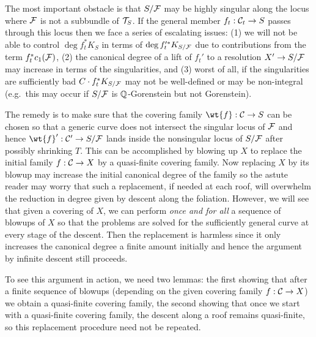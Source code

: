 \documentclass[main.tex]{subfiles}
\begin{document}
The most important obstacle is that $S / \mathcal{F}$ may be highly singular along the locus where $\mathcal{F}$ is not a subbundle of $\mathcal{T}_S$. If the general member $f_t : \mathcal{C}_t \to S$ passes through this locus then we face a series of escalating issues: (1) we will not be able to control $\deg{f_t^* K_S}$ in terms of $\deg{f_t'^* K_{S/\mathcal{F}}}$ due to contributions from the term $f_t^* c_1(\mathcal{F})$, (2) the canonical degree of a lift of $f_t'$ to a resolution $X' \to S / \mathcal{F}$ may increase in terms of the singularities, and (3) worst of all, if the singularities are sufficiently bad $C \cdot f_t^* K_{S/\mathcal{F}}$ may not be well-defined or may be non-integral (e.g.\ this may occur if $S / \mathcal{F}$ is $\mathbb{Q}$-Gorenstein but not Gorenstein). 
\par
The remedy is to make sure that the covering family $\wt{f} : \cC \to S$ can be chosen so that a generic curve does not intersect the singular locus of $\mathcal{F}$ and hence $\wt{f}' : \cC' \to S/\F$ lands inside the nonsingular locus of $S / \mathcal{F}$ after possibly shrinking $T$. This can be accomplished by blowing up $X$ to replace the initial family $f : \mathcal{C} \to X$ by a quasi-finite covering family. Now replacing $X$ by its blowup may increase the initial canonical degree of the family so the astute reader may worry that such a replacement, if needed at each roof, will overwhelm the reduction in degree given by descent along the foliation. However, we will see that given a covering of $X$, we can perform \textit{once and for all} a sequence of blowups of $X$ so that the problems are solved for the sufficiently general curve at every stage of the descent. Then the replacement is harmless since it only increases the canonical degree a finite amount initially and hence the argument by infinite descent still proceeds. 
\par 
To see this argument in action, we need two lemmas: the first showing that after a finite sequence of blowups (depending on the given covering family $f : \mathcal{C} \to X$) we obtain a quasi-finite covering family, the second showing that once we start with a quasi-finite covering family, the descent along a roof remains quasi-finite, so this replacement procedure need not be repeated. 
\end{document}
